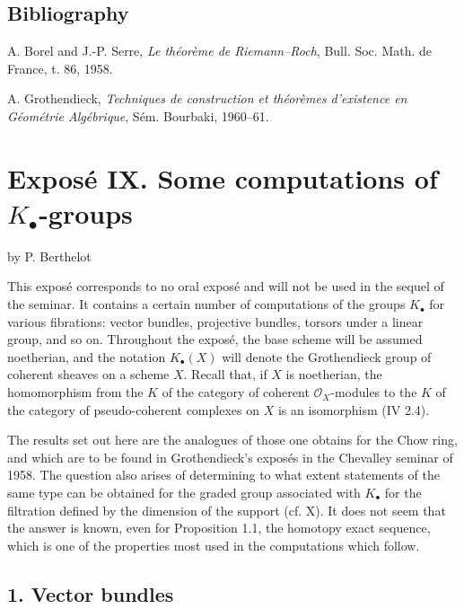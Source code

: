 \documentclass[11pt]{article}
\begin{document}
\subsection*{Bibliography}
\begin{enumerate}[label={[\arabic*]}]
\item A. Borel and J.-P. Serre, \emph{Le théorème de Riemann--Roch}, Bull. Soc. Math. de France, t. 86, 1958.
\item A. Grothendieck, \emph{Techniques de construction et théorèmes d'existence en Géométrie Algébrique}, Sém. Bourbaki, 1960--61.
\end{enumerate}



\section*{Exposé IX. Some computations of $K_\bullet$-groups}
\begin{center}
by P. Berthelot
\end{center}

This exposé corresponds to no oral exposé and will not be used in the sequel of the seminar. It contains a certain number of computations of the groups $K_\bullet$ for various fibrations: vector bundles, projective bundles, torsors under a linear group, and so on. Throughout the exposé, the base scheme will be assumed noetherian, and the notation $K_\bullet(X)$ will denote the Grothendieck group of coherent sheaves on a scheme $X$. Recall that, if $X$ is noetherian, the homomorphism from the $K$ of the category of coherent $\mathcal O_X$-modules to the $K$ of the category of pseudo-coherent complexes on $X$ is an isomorphism (IV 2.4).

The results set out here are the analogues of those one obtains for the Chow ring, and which are to be found in Grothendieck's exposés in the Chevalley seminar of 1958. The question also arises of determining to what extent statements of the same type can be obtained for the graded group associated with $K_\bullet$ for the filtration defined by the dimension of the support (cf. X). It does not seem that the answer is known, even for Proposition 1.1, the homotopy exact sequence, which is one of the properties most used in the computations which follow.

\subsection*{1. Vector bundles}
\end{document}
